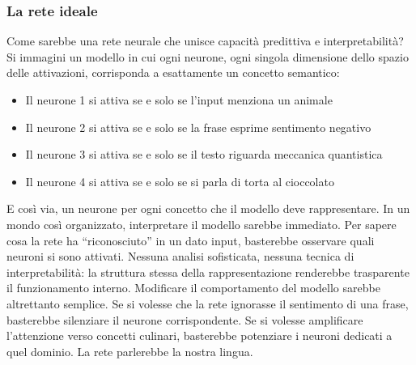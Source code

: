 \subsubsection{La rete ideale}
Come sarebbe una rete neurale che unisce capacità predittiva e interpretabilità? Si immagini un modello in cui ogni neurone, ogni singola dimensione dello spazio delle attivazioni, corrisponda a esattamente un concetto semantico:
\begin{itemize}
    \item Il neurone 1 si attiva se e solo se l'input menziona un animale
    \item Il neurone 2 si attiva se e solo se la frase esprime sentimento negativo
    \item Il neurone 3 si attiva se e solo se il testo riguarda meccanica quantistica
    \item Il neurone 4 si attiva se e solo se si parla di torta al cioccolato
\end{itemize}
E così via, un neurone per ogni concetto che il modello deve rappresentare.
In un mondo così organizzato, interpretare il modello sarebbe immediato. Per sapere cosa la rete ha ``riconosciuto'' in un dato input, basterebbe osservare quali neuroni si sono attivati. Nessuna analisi sofisticata, nessuna tecnica di interpretabilità: la struttura stessa della rappresentazione renderebbe trasparente il funzionamento interno.
Modificare il comportamento del modello sarebbe altrettanto semplice. Se si volesse che la rete ignorasse il sentimento di una frase, basterebbe silenziare il neurone corrispondente. Se si volesse amplificare l'attenzione verso concetti culinari, basterebbe potenziare i neuroni dedicati a quel dominio. La rete parlerebbe la nostra lingua.

